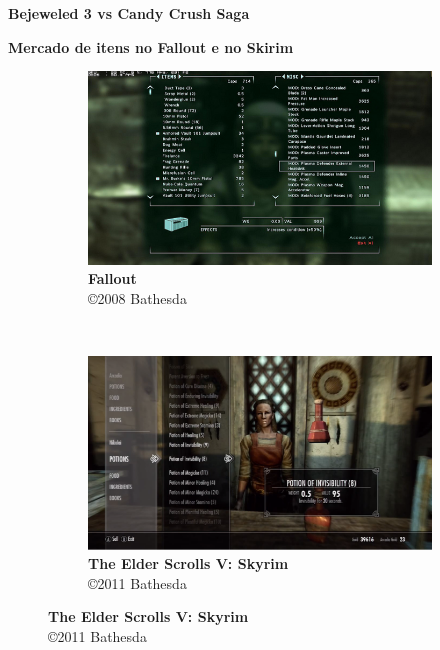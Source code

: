 \expandafter\documentclass\expandafter[table, usenames, svgnames, dvipsnames, \classopts]{beamer}
\begin{document}
\begin{frame}{\textbf{Bejeweled 3 vs Candy Crush Saga}}

\end{frame}

\begin{frame}{\textbf{Mercado de itens no Fallout e no Skirim}}

	\begin{figure}
	    \centering

	    \begin{subfigure}[!h]{0.4\paperwidth}
	    	\centering
	    	\includegraphics[draft,height=0.32\paperheight]{fallout-screenshot}
	        \caption{\scriptsize\textbf{Fallout}\\\copyright{2008} Bathesda\footnotemark{}}
	    \end{subfigure}
	    ~
		\begin{subfigure}[!h]{0.4\paperwidth}
			\centering
	        \includegraphics[draft,height=0.32\paperheight]{skyrim-screenshot}
	        \caption{\scriptsize\textbf{The Elder Scrolls V: Skyrim}\\\copyright{2011} Bathesda\footnotemark{}}
	    \end{subfigure}
    \end{figure}


\end{frame}
\end{document}
